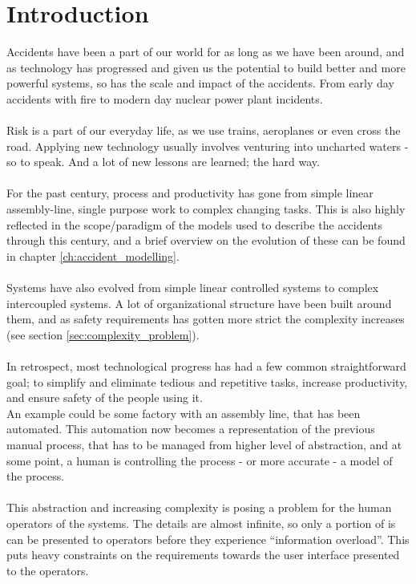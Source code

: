 \chapter{Introduction}
Accidents have been a part of our world for as long as we have been around, and as technology has progressed and given us the potential to build better and more powerful systems, so has the scale and impact of the accidents. From early day accidents with fire to modern day nuclear power plant incidents.\\
\\
Risk is a part of our everyday life, as we use trains, aeroplanes or even cross the road. Applying new technology usually involves venturing into uncharted waters - so to speak. And a lot of new lessons are learned; the hard way.\\
\\
For the past century, process and productivity has gone from simple linear assembly-line, single purpose work to complex changing tasks. This is also highly reflected in the scope/paradigm of the models used to describe the accidents through this century, and a brief overview on the evolution of these can be found in chapter \ref{ch:accident_modelling}.\\
\\
Systems have also evolved from simple linear controlled systems to complex intercoupled systems. A lot of organizational structure have been built around them, and as safety requirements has gotten more strict the complexity increases (see section \ref{sec:complexity_problem}).\\
\\
In retrospect, most technological progress has had a few common straightforward goal; to simplify and eliminate tedious and repetitive tasks, increase productivity, and ensure safety of the people using it.\\
An example could be some factory with an assembly line, that has been automated. This automation now becomes a representation of the previous manual process, that has to be managed from higher level of abstraction, and at some point, a human is controlling the process - or more accurate - a model of the process.\\
\\
This abstraction and increasing complexity is posing a problem for the human operators of the systems. The details are almost infinite, so only a portion of is can be presented to operators before they experience ``information overload''. This puts heavy constraints on the requirements towards the user interface presented to the operators.\\
